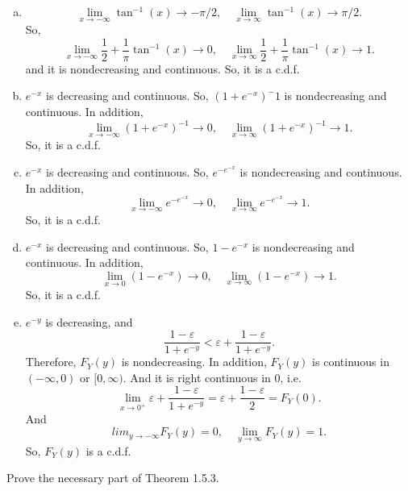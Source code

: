 \documentclass[14pt]{elegantbook}
\begin{document}
    \begin{solution}
        \begin{enumerate}[(a)]
            \item \[
                \lim_{x\to-\infty}\tan^{-1}(x)\to-\pi/2, \quad \lim_{x\to\infty}\tan^{-1}(x)\to\pi/2. 
                \]
                So, \[
                    \lim_{x\to-\infty}\frac{1}{2}+\frac{1}{\pi}\tan^{-1}(x)\to0, \quad \lim_{x\to\infty}\frac{1}{2}+\frac{1}{\pi}\tan^{-1}(x)\to1. 
                \] and it is nondecreasing and continuous. So, it is a c.d.f. 
            \item $e^{-x}$ is decreasing and continuous. So, $(1+e^{-x})^-1$ is nondecreasing and continuous. In addition, \[
                \lim_{x\to-\infty}(1+e^{-x})^{-1}\to0, \quad \lim_{x\to\infty}(1+e^{-x})^{-1}\to1.
            \] So, it is a c.d.f. 
            \item $e^{-x}$ is decreasing and continuous. So, $e^{-e^{-x}}$ is nondecreasing and continuous. In addition, \[
                \lim_{x\to-\infty}e^{-e^{-x}}\to0, \quad \lim_{x\to\infty}e^{-e^{-x}}\to1.
            \] So, it is a c.d.f.
            \item $e^{-x}$ is decreasing and continuous. So, $1-e^{-x}$ is nondecreasing and continuous. In addition, \[
                \lim_{x\to0}(1-e^{-x})\to0, \quad \lim_{x\to\infty}(1-e^{-x})\to1.
            \] So, it is a c.d.f.
            \item $e^{-y}$ is decreasing, and \[
                \frac{1-\varepsilon}{1+e^{-y}}<\varepsilon+\frac{1-\varepsilon}{1+e^{-y}}. 
            \]
            Therefore, $F_Y(y)$ is nondecreasing. In addition, $F_Y(y)$ is continuous in $(-\infty, 0)$ or $[0, \infty)$. And it is right continuous in $0$, i.e. 
            \[\lim_{x\to0^+}\varepsilon+\frac{1-\varepsilon}{1+e^{-y}}=\varepsilon+\frac{1-\varepsilon}{2}=F_Y(0). \]
            And \[lim_{y\to -\infty}F_Y(y)=0,\quad \lim_{y\to\infty}F_Y(y)=1. \]
            So, $F_Y(y)$ is a c.d.f.
        \end{enumerate}
    \end{solution}

    \begin{exercise}
        Prove the necessary part of Theorem 1.5.3. 
    \end{exercise}
\end{document}
